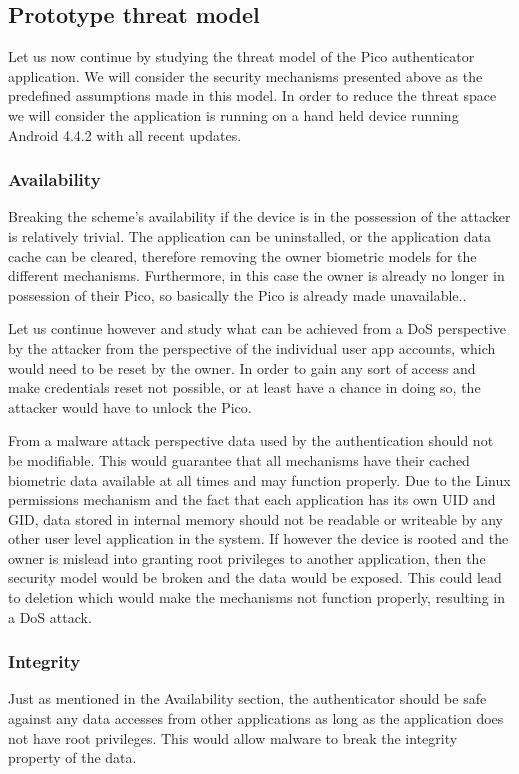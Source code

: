 \subsection{Prototype threat model}
Let us now continue by studying the threat model of the Pico authenticator application. We will consider the security mechanisms presented above as the predefined assumptions made in this model. In order to reduce the threat space we will consider the application is running on a hand held device running Android 4.4.2 with all recent updates.

\subsubsection*{Availability}
Breaking the scheme's availability if the device is in the possession of the attacker is relatively trivial. The application can be uninstalled, or the application data cache can be cleared, therefore removing the owner biometric models for the different mechanisms. Furthermore, in this case the owner is already no longer in possession of their Pico, so basically the Pico is already made unavailable..

Let us continue however and study what can be achieved from a DoS perspective by the attacker from the perspective of the individual user app accounts, which would need to be reset by the owner. In order to gain any sort of access and make credentials reset not possible, or at least have a chance in doing so, the attacker would have to unlock the Pico.

From a malware attack perspective data used by the authentication should not be modifiable. This would guarantee that all mechanisms have their cached biometric data available at all times and may function properly. Due to the Linux permissions mechanism and the fact that each application has its own UID and GID, data stored in internal memory should not be readable or writeable by any other user level application in the system. If however the device is rooted and the owner is mislead into granting root privileges to another application, then the security model would be broken and the data would be exposed. This could lead to deletion which would make the mechanisms not function properly, resulting in a DoS attack.


\subsubsection*{Integrity}
Just as mentioned in the Availability section, the authenticator should be safe against any data accesses from other applications as long as the application does not have root privileges. This would allow malware to break the integrity property of the data.

